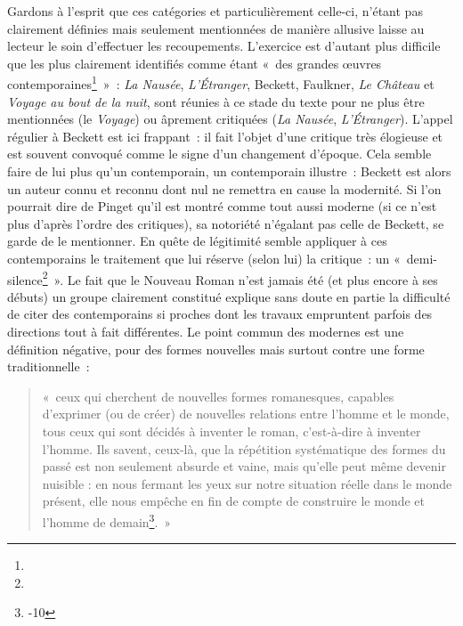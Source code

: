 \documentclass[12pt, a4paper]{article}
\begin{document}
Gardons à l'esprit que ces catégories et particulièrement celle-ci, n'étant pas clairement définies mais seulement mentionnées de manière allusive laisse au lecteur le soin d'effectuer les recoupements. L'exercice est d'autant plus difficile que les plus clairement identifiés comme étant «~des grandes œuvres contemporaines\footnote{}~»~: \textit{La Nausée}, \textit{L'Étranger}, Beckett, Faulkner, \textit{Le Château} et \textit{Voyage au bout de la nuit}, sont réunies à ce stade du texte pour ne plus être mentionnées (le \textit{Voyage}) ou âprement critiquées (\textit{La Nausée}, \textit{L'Étranger}). L'appel régulier à Beckett est ici frappant~: il fait l'objet d'une critique très élogieuse et est souvent convoqué comme le signe d'un changement d'époque. Cela semble faire de lui plus qu'un contemporain, un contemporain illustre~: Beckett est alors un auteur connu et reconnu dont nul ne remettra en cause la modernité. Si l'on pourrait dire de Pinget qu'il est montré comme tout aussi moderne (si ce n'est plus d'après l'ordre des critiques), sa notoriété n'égalant pas celle de Beckett, \robbe{} se garde de le mentionner. En quête de légitimité \robbe{} semble appliquer à ces contemporains le traitement que lui réserve (selon lui) la critique~: un «~demi-silence\footnote{}~». Le fait que le Nouveau Roman n'est jamais été (et plus encore à ses débuts) un groupe clairement constitué explique sans doute en partie la difficulté de citer des contemporains si proches dont les travaux empruntent parfois des directions tout à fait différentes. Le point commun des modernes est une définition négative, pour des formes nouvelles mais surtout contre une forme traditionnelle~:
\begin{quote}
«~ceux qui cherchent de nouvelles formes romanesques, capables d’exprimer (ou de créer) de nouvelles relations entre l’homme et le monde, tous ceux qui sont décidés à inventer le roman, c’est-à-dire à inventer l’homme. Ils savent, ceux-là, que la répétition systématique des formes du passé est non seulement absurde et vaine, mais qu’elle peut même devenir nuisible : en nous fermant les yeux sur notre situation réelle dans le monde présent, elle nous empêche en fin de compte de construire le monde et l’homme de demain\footnote{-10}.~»    
\end{quote}
\end{document}
